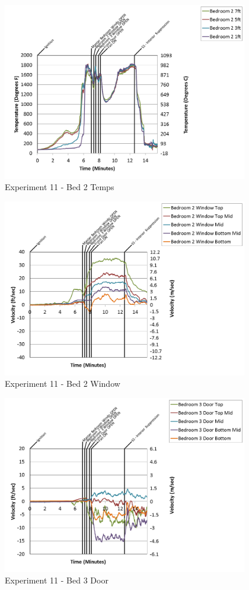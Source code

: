 \documentclass{article}
\begin{document}
\begin{appendices}
\begin{figure}[h!]
	\centering
	\includegraphics[height=3.05in]{0_Images/Results_Charts/Exp_11_Charts/Bed2Temps.png}
	\caption{Experiment 11 - Bed 2 Temps}
\end{figure}

\clearpage

\begin{figure}[h!]
	\centering
	\includegraphics[height=3.05in]{0_Images/Results_Charts/Exp_11_Charts/Bed2Window.png}
	\caption{Experiment 11 - Bed 2 Window}
\end{figure}


\begin{figure}[h!]
	\centering
	\includegraphics[height=3.05in]{0_Images/Results_Charts/Exp_11_Charts/Bed3Door.png}
	\caption{Experiment 11 - Bed 3 Door}
\end{figure}


\end{appendices}
\end{document}
